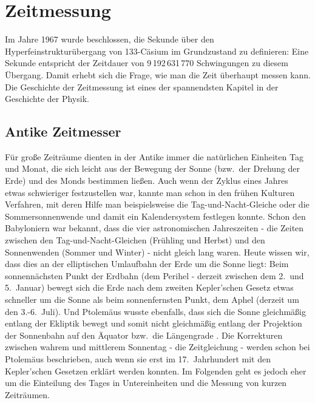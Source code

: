 
\chapter{Zeitmessung}
\label{chap_Uhren}


%
Im Jahre 1967 wurde beschlossen, die Sekunde \"uber den Hyperfeinstruktur\"ubergang
von 133-C\"asium im Grundzustand zu definieren: Eine Sekunde entspricht der Zeitdauer von
9\,192\,631\,770 Schwingungen zu diesem \"Ubergang. 
Damit erhebt sich die Frage, wie man die Zeit
\"uberhaupt messen kann. Die Geschichte der Zeitmessung ist eines der spannendsten Kapitel
in der Geschichte der Physik. 

\section{Antike Zeitmesser}

F\"ur gro\ss e Zeitr\"aume dienten in der Antike immer die nat\"urlichen
Einheiten Tag und Monat, die sich leicht aus der Bewegung der Sonne (bzw.\ der Drehung der Erde) 
und des Monds bestimmen lie\ss en.
Auch wenn der Zyklus eines Jahres etwas schwieriger festzustellen war, kannte
man schon in den fr\"uhen Kulturen Verfahren, mit deren Hilfe man beispielsweise die Tag-und-Nacht-Gleiche
oder die Sommersonnenwende und damit ein Kalendersystem festlegen konnte. 
Schon den Babyloniern war bekannt, dass die vier astronomischen Jahreszeiten - die Zeiten
zwischen den Tag-und-Nacht-Gleichen (Fr\"uhling und Herbst) und den Sonnenwenden
(Sommer und Winter) - nicht gleich lang waren. Heute wissen wir, dass dies an der
elliptischen Umlaufbahn der Erde um die Sonne liegt: Beim sonnenn\"achsten Punkt der Erdbahn
(dem Perihel - derzeit zwischen dem 2.\ und 5.\ Januar) bewegt sich die Erde nach dem zweiten Kepler'schen
Gesetz etwas schneller um die Sonne als beim sonnen\-fernsten Punkt, dem Aphel (derzeit um den 3.-6.\ Juli).  
Und Ptolem\"aus wusste ebenfalls, dass sich die Sonne gleichm\"a\ss ig entlang der Ekliptik bewegt und somit
nicht gleichm\"a\ss ig entlang der Projektion der Sonnenbahn auf den \"Aquator 
bzw.\ die L\"angengrade \cite{Neugebauer}. Die Korrekturen zwischen
wahrem und mittlerem Sonnentag - die Zeitgleichung - werden schon bei Ptolem\"aus beschrieben, auch wenn
sie erst im 17.\ Jahrhundert mit den Kepler'schen Gesetzen erkl\"art werden konnten.
Im Folgenden geht es jedoch eher um die Einteilung des Tages in Untereinheiten und die Messung
von kurzen Zeitr\"aumen.

